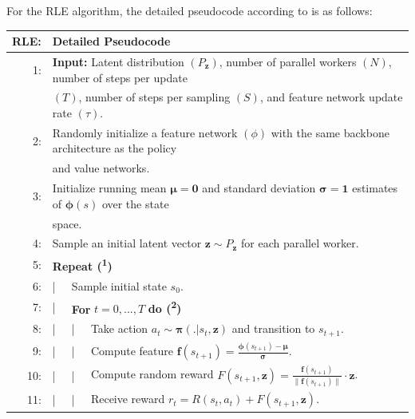 \noindent For the \textsc{RLE} algorithm, the detailed pseudocode according to \cite{rle-paper} is as follows:

\hypertarget{algo-rle}{
\begin{table}[h!]
  \centering
  \begin{tabular}{rlllll}
    \hline\hline
    \textbf{RLE:} & \multicolumn{5}{l}{Detailed Pseudocode}\\
    \hline
    1: & \multicolumn{5}{l}{\textbf{Input:} Latent distribution $\left(P_{\textbf{z}}\right)$, number of parallel workers $\left(N\right)$, number of steps per update}\\
    & \multicolumn{5}{l}{$\left(T\right)$, number of steps per sampling $\left(S\right)$, and feature network update rate $\left(\tau\right)$.}\\
    2: & \multicolumn{5}{l}{Randomly initialize a feature network $\left(\phi\right)$ with the same backbone architecture as the policy }\\
    & \multicolumn{5}{l}{and value networks.}\\
    3: & \multicolumn{5}{l}{Initialize running mean $\boldsymbol{\mu} = \textbf{0}$ and standard deviation $\boldsymbol{\sigma} = \textbf{1}$ estimates of $\boldsymbol{\phi} \left(s\right)$ over the state}\\
    & \multicolumn{5}{l}{space.}\\
    4: & \multicolumn{5}{l}{Sample an initial latent vector $\textbf{z} \sim P_{\textbf{z}}$ for each parallel worker.}\\
    5: & \multicolumn{5}{l}{\textbf{Repeat (\textsuperscript{1})}}\\
    6: & | & \multicolumn{4}{l}{Sample initial state $s_{0}$.}\\
    7: & | & \multicolumn{4}{l}{\textbf{For} $t = 0, ..., T$ \textbf{do (\textsuperscript{2})}}\\
    8: & | & | & \multicolumn{3}{l}{Take action $a_{t} \sim \boldsymbol{\pi}(. | s_{t}, \textbf{z})$ and transition to $s_{t+1}$.}\\
    9: & | & | & \multicolumn{3}{l}{Compute feature $\textbf{f}(s_{t+1}) = \frac{\boldsymbol{\phi}(s_{t+1}) - \boldsymbol{\mu}}{\boldsymbol{\sigma}}$.}\\
    10: & | & | & \multicolumn{3}{l}{Compute random reward $F(s_{t+1}, \textbf{z}) = \frac{\textbf{f}(s_{t+1})}{\| \textbf{f}(s_{t+1}) \|} \cdot \textbf{z}$.}\\
    11: & | & | & \multicolumn{3}{l}{Receive reward $r_{t} = R(s_{t}, a_{t}) + F(s_{t+1}, \textbf{z})$.}\\

\end{tabular}
\end{table}}
